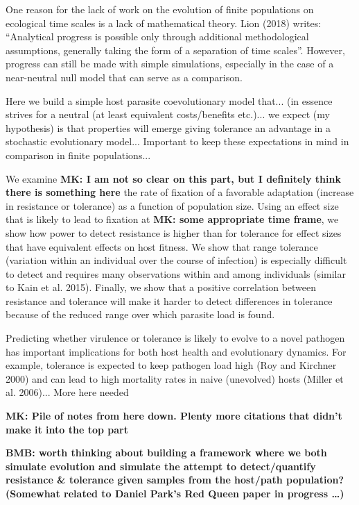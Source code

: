 \documentclass{article}
\newcommand{\mk}[1]{{\bf \color{red} MK: #1}}
\newcommand{\bb}[1]{{\bf \color{blue} BMB: #1}}
\begin{document}
One reason for the lack of work on the evolution of finite populations on ecological time scales is a lack of mathematical theory. Lion (2018) writes: ``Analytical progress is possible only through additional methodological assumptions, generally taking the form of a separation of time scales''. However, progress can still be made with simple simulations, especially in the case of a near-neutral null model that can serve as a comparison. 

Here we build a simple host parasite coevolutionary model that... (in essence strives for a neutral (at least equivalent costs/benefits etc.)... we expect (my hypothesis) is that properties will emerge giving tolerance an advantage in a stochastic evolutionary model... Important to keep these expectations in mind in comparison in finite populations... 

We examine \mk{I am not so clear on this part, but I definitely think there is something here} the rate of fixation of a favorable adaptation (increase in resistance or tolerance) as a function of population size. Using an effect size that is likely to lead to fixation at \mk{some appropriate time frame}, we show how power to detect resistance is higher than for tolerance for effect sizes that have equivalent effects on host fitness. We show that range tolerance (variation within an individual over the course of infection) is especially difficult to detect and requires many observations within and among individuals (similar to Kain et al. 2015). Finally, we show that a positive correlation between resistance and tolerance will make it harder to detect differences in tolerance because of the reduced range over which parasite load is found. 

Predicting whether virulence or tolerance is likely to evolve to a novel pathogen has important implications for both host health and evolutionary dynamics. For example, tolerance is expected to keep pathogen load high (Roy and Kirchner 2000) and can lead to high mortality rates in naive (unevolved) hosts (Miller et al. 2006)... More here needed
 
\mk{Pile of notes from here down. Plenty more citations that didn't make it into the top part}

\bb{worth thinking about building a framework where we both simulate evolution and simulate the attempt to detect/quantify resistance \& tolerance given samples from the host/path population? (Somewhat related to Daniel Park's Red Queen paper in progress \ldots)}
\end{document}
